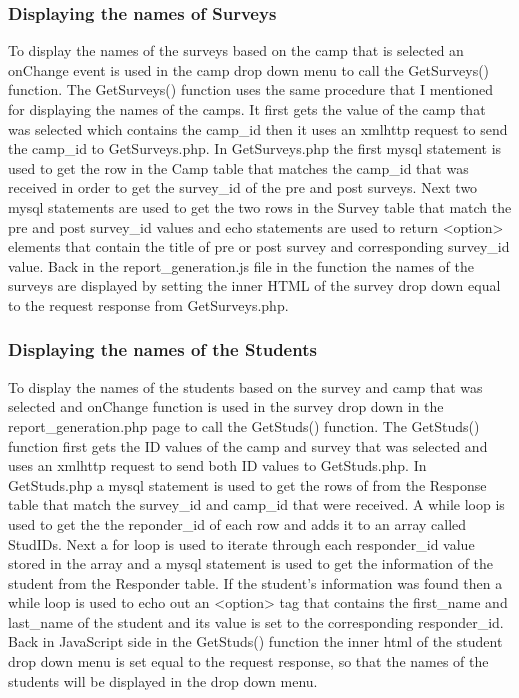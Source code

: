 \documentclass[../final.tex]{subfiles}
\begin{document}
	\subsubsection{Displaying the names of Surveys}
	To display the names of the surveys based on the camp that is selected an onChange event is used in the camp drop down menu to call the GetSurveys() function. The GetSurveys() function uses the same procedure that I mentioned for displaying the names of the camps. It first gets the value of the camp that was selected which contains the camp\_id then it uses an xmlhttp request to send the camp\_id to GetSurveys.php. In GetSurveys.php the first mysql statement is used to get the row in the Camp table that matches the camp\_id that was received in order to get the survey\_id of the pre and post surveys. Next two mysql statements are used to get the two rows in the Survey table that match the pre and post survey\_id values and echo statements are used to return <option> elements that contain the title of pre or post survey and corresponding survey\_id value. Back in the report\_generation.js file in the function the names of the surveys are displayed by setting the inner HTML of the survey drop down equal to the request response from GetSurveys.php. 
	\subsubsection{Displaying the names of the Students}
	To display the names of the students based on the survey and camp that was selected and onChange function is used in the survey drop down in the report\_generation.php page to call the GetStuds() function. The GetStuds() function first gets the ID values of the camp and survey that was selected and uses an xmlhttp request to send both ID values to GetStuds.php. In GetStuds.php a mysql statement is used to get the rows of from the Response table that match the survey\_id and camp\_id that were received. A while loop is used to get the the reponder\_id of each row and adds it to an array called StudIDs. Next a for loop is used to iterate through each responder\_id value stored in the array and a mysql statement is used to get the information of the student from the Responder table. If the student's information was found then a while loop is used to echo out an <option> tag that contains the first\_name and last\_name of the student and its value is set to the corresponding responder\_id. Back in JavaScript side in the GetStuds() function the inner html of the student drop down menu is set equal to the request response, so that the names of the students will  be displayed in the drop down menu. 
\end{document}
